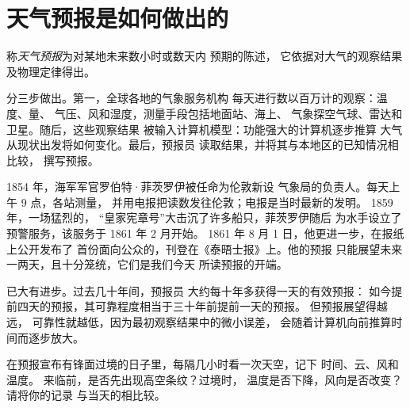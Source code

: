 \section{天气预报是如何做出的}

\begin{definition}[天气预报]\label{def:g8:fronts-and-weather-maps:forecast}
称\emph{天气预报}为对某地未来数小时或数天内
预期的陈述，
它依据对大气的观察结果及物理定律得出。
\end{definition}

分三步做出。第一，全球各地的气象服务机构
每天进行数以百万计的观察：温度、量、
气压、风和湿度，测量手段包括地面站、海上、
气象探空气球、雷达和卫星。随后，这些观察结果
被输入计算机模型：功能强大的计算机逐步推算
大气从现状出发将如何变化。最后，预报员
读取结果，并将其与本地区的已知情况相比较，
撰写预报。

\begin{history}[首次公开发布的天气预报]
1854 年，海军军官罗伯特·菲茨罗伊被任命为伦敦新设
气象局的负责人。每天上午 9 点，各站测量，
并用电报把读数发往伦敦；电报是当时最新的发明。
1859 年，一场猛烈的，
“皇家宪章号”大击沉了许多船只，菲茨罗伊随后
为水手设立了预警服务，该服务于 1861 年 2 月开始。
1861 年 8 月 1 日，他更进一步，在报纸上公开发布了
首份面向公众的，刊登在《泰晤士报》上。他的预报
只能展望未来一两天，且十分笼统，它们是我们今天
所读预报的开端。
\end{history}

已大有进步。过去几十年间，预报员
大约每十年多获得一天的有效预报：
如今提前四天的预报，其可靠程度相当于三十年前提前一天的预报。
但预报展望得越远，
可靠性就越低，因为最初观察结果中的微小误差，
会随着计算机向前推算时间而逐步放大。

\begin{inthefield}[观察锋面的到来]
在预报宣布有锋面过境的日子里，每隔几小时看一次天空，记下
时间、云、风和温度。
来临前，是否先出现高空条纹？过境时，
温度是否下降，风向是否改变？请将你的记录
与当天的相比较。
\end{inthefield}

